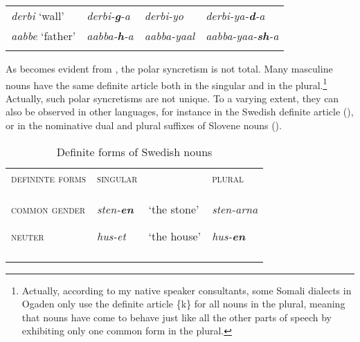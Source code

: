 \documentclass[output=paper]{langsci/langscibook}
\begin{document}
\begin{table}
\begin{tabularx}{\textwidth}{XXlX}
{\textit{derbi} ‘wall’} &   {\textit{derbi-}\textbf{\textit{g}}\textit{-a}}  & {\textit{derbi-yo}}   & {\textit{derbi-ya-}\textbf{\textit{d}}\textit{-a}}   \\

{\textit{aabbe} ‘father’} & {\textit{aabba-}\textbf{\textit{h}}\textit{-a}}  & {\textit{aabba-yaal}} & {\textit{aabba-yaa-}\textbf{\textit{sh}}\textit{-a}}\\

\lspbottomrule
\end{tabularx}
\end{table} 


As becomes evident from , the polar syncretism is not total. Many masculine nouns have the same definite article both in the singular and in the plural.\footnote{Actually, according to my native speaker consultants, some Somali dialects in Ogaden only use the definite article \{k\} for all nouns in the plural, meaning that nouns have come to behave just like all the other parts of speech by exhibiting only one common form in the plural.} Actually, such polar syncretisms are not unique. To a varying extent, they can also be observed in other languages, for instance in the Swedish definite article (), or in the nominative dual and plural suffixes of Slovene nouns ().
 
\begin{table}
\caption{Definite forms of Swedish nouns}
\label{tab:7}

\begin{tabularx}{\textwidth}{XXXX}
\lsptoprule
{\textsc{defininte forms}} & {\textsc{singular}} &  & {\textsc{plural}}\\
{\textsc{common gender}}

{\textsc{neuter}} & {\textit{sten-}\textbf{\textit{en}}}

{\textit{hus-et}} & {‘the stone’}

{‘the house’} & {\textit{sten-arna}}

{\textit{hus-}\textbf{\textit{en}}}\\
\lspbottomrule
\end{tabularx}

\end{table} 
\end{document}
